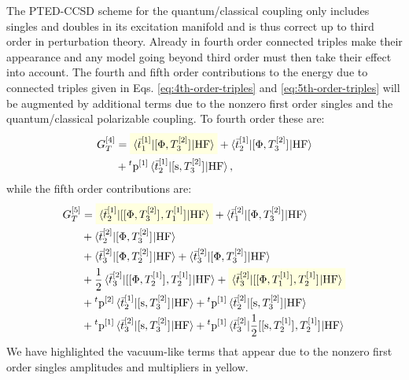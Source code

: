 The \acrshort{PTED}-\acrshort{CCSD} scheme for the quantum/classical coupling
only includes singles and doubles in its excitation manifold and is thus
correct up to third order in perturbation theory.
Already in fourth order connected triples make their appearance and any
model going beyond third order must then take their effect into account.
The fourth and fifth order contributions to the energy due to connected
triples given in Eqs.
\eqref{eq:4th-order-triples} and \eqref{eq:5th-order-triples} will be
augmented by additional terms due to the nonzero first order singles and
the quantum/classical polarizable coupling.
To fourth order these are:
\begin{equation}\label{eq:triples-fourth-order}
  \begin{aligned}
  G_T^{[4]} &=
  \highlight{brewerYellow}{\braket{\tbar{1}^{[1]} | \commutator{\Phi}{T_3^{[2]}} | \mathrm{HF}}}
  + \braket{\tbar{2}^{[1]}| \commutator{\Phi}{T_3^{[2]}} | \mathrm{HF}} \\
  &+ {}^t\p^{[1]}\braket{\tbar{2}^{[1]} | \commutator{\s}{T_3^{[2]}} |
  \mathrm{HF}},
  \end{aligned}
\end{equation}
while the fifth order contributions are:
\begin{equation}\label{eq:triples-fifth-order}
  \begin{aligned}
  G_T^{[5]} &=
    \highlight{brewerYellow}{
    \braket{\tbar{2}^{[1]} |
    \commutator{\commutator{\Phi}{T_3^{[2]}}}{T_1^{[1]}}
    | \mathrm{HF}}
    }
    +
    \braket{\tbar{1}^{[2]} | \commutator{\Phi}{T_3^{[2]}} | \mathrm{HF}} \\
  &+ \braket{\tbar{2}^{[2]} | \commutator{\Phi}{T_3^{[2]}} | \mathrm{HF}} \\
  &+ \braket{\tbar{3}^{[2]} | \commutator{\Phi}{T_2^{[2]}} | \mathrm{HF}}
  + \braket{\tbar{3}^{[2]} | \commutator{\Phi}{T_3^{[2]}} | \mathrm{HF}}
  \\
    &+
    \frac{1}{2}\braket{\tbar{3}^{[2]} |
    \commutator{\commutator{\Phi}{T_2^{[1]}}}{T_2^{[1]}}
    | \mathrm{HF}}
  +
  \highlight{brewerYellow}{
    \braket{\tbar{3}^{[2]} |
    \commutator{\commutator{\Phi}{T_1^{[1]}}}{T_2^{[1]}}
    | \mathrm{HF}}
   }
   \\
   &+
    {}^t\p^{[2]}\braket{\tbar{2}^{[1]} | \commutator{\s}{T_3^{[2]}} | \mathrm{HF}}
  + {}^t\p^{[1]}\braket{\tbar{2}^{[2]} | \commutator{\s}{T_3^{[2]}} | \mathrm{HF}} \\
  &+ {}^t\p^{[1]}\braket{\tbar{3}^{[2]} | \commutator{\s}{T_3^{[2]}} | \mathrm{HF}}
  + {}^t\p^{[1]}\braket{\tbar{3}^{[2]} |
    \frac{1}{2}\commutator{\commutator{\s}{T_2^{[1]}}}{T_2^{[1]}}
    | \mathrm{HF}}
  \end{aligned}
\end{equation}
We have highlighted the vacuum-like terms that appear due to the nonzero
first order singles amplitudes and multipliers in yellow.

